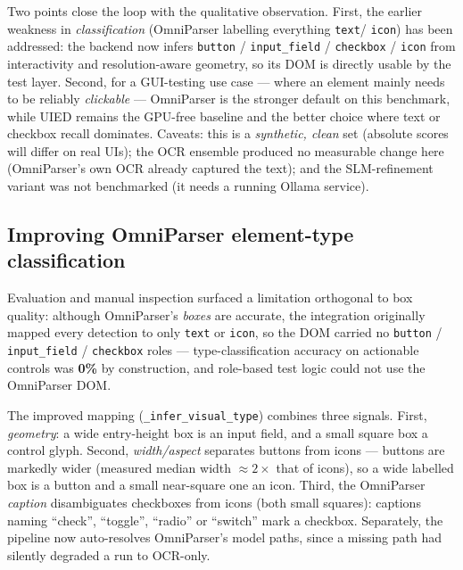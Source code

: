 \documentclass[11pt,a4paper]{article}
\newcommand{\code}[1]{\texttt{#1}}
\begin{document}
Two points close the loop with the qualitative observation. First, the earlier
weakness in \emph{classification} (OmniParser labelling everything \code{text}/
\code{icon}) has been addressed: the backend now infers \code{button} /
\code{input\_field} / \code{checkbox} / \code{icon} from interactivity and
resolution-aware geometry, so its DOM is directly usable by the test layer. Second,
for a GUI-testing use case --- where an element mainly needs to be reliably
\emph{clickable} --- OmniParser is the stronger default on this benchmark, while
UIED remains the GPU-free baseline and the better choice where text or checkbox
recall dominates. Caveats: this is a \emph{synthetic, clean} set (absolute scores
will differ on real UIs); the OCR ensemble produced no measurable change here
(OmniParser's own OCR already captured the text); and the SLM-refinement variant was
not benchmarked (it needs a running Ollama service).

\subsection{Improving OmniParser element-type classification}
Evaluation and manual inspection surfaced a limitation orthogonal to box quality:
although OmniParser's \emph{boxes} are accurate, the integration originally mapped
every detection to only \code{text} or \code{icon}, so the DOM carried no
\code{button} / \code{input\_field} / \code{checkbox} roles --- type-classification
accuracy on actionable controls was \textbf{0\%} by construction, and role-based
test logic could not use the OmniParser DOM.

The improved mapping (\code{\_infer\_visual\_type}) combines three signals. First,
\emph{geometry}: a wide entry-height box is an input field, and a small square box a
control glyph. Second, \emph{width/aspect} separates buttons from icons --- buttons
are markedly wider (measured median width $\approx 2\times$ that of icons), so a
wide labelled box is a button and a small near-square one an icon. Third, the
OmniParser \emph{caption} disambiguates checkboxes from icons (both small squares):
captions naming ``check'', ``toggle'', ``radio'' or ``switch'' mark a checkbox.
Separately, the pipeline now auto-resolves OmniParser's model paths, since a missing
path had silently degraded a run to OCR-only.
\end{document}
